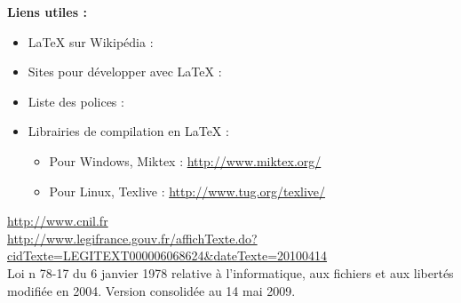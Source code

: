\documentclass[a4paper,11pt]{article}				    %
\begin{document}
{\textbf{\huge Liens utiles :}
\begin{itemize}
	\item {\LaTeX} sur Wikip\'edia :
	\item Sites pour d\'evelopper avec {\LaTeX} :
	\item Liste des polices :
	\item Librairies de compilation en {\LaTeX} :
	\begin{itemize}
		\item Pour Windows, Miktex : \url{http://www.miktex.org/}
		\item Pour Linux, Texlive : \url{http://www.tug.org/texlive/}
	\end{itemize}
\end{itemize}
}
{
\url{http://www.cnil.fr}\\
\url{http://www.legifrance.gouv.fr/affichTexte.do?cidTexte=LEGITEXT000006068624&dateTexte=20100414}
}
{
\\Loi n 78-17 du 6 janvier 1978 relative \`a l'informatique, aux fichiers et aux libert\'es modifi\'ee en 2004. 
Version consolid\'ee au 14 mai 2009.
}
\end{document}
